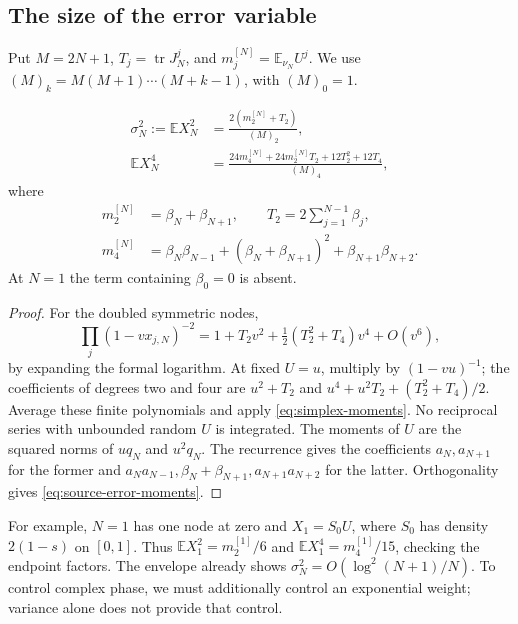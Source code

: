 \subsection{The size of the error variable}

Put \(M=2N+1\), \(T_j=\operatorname{tr}J_N^j\), and
\(m_j^{[N]}=\mathbb E_{\nu_N}U^j\). We use
\((M)_k=M(M+1)\cdots(M+k-1)\), with \((M)_0=1\).

\begin{proposition}
\label{prop:error-moments}
\begin{equation}
 \begin{aligned}
 \sigma_N^2:=\mathbb E X_N^2
   &=\frac{2(m_2^{[N]}+T_2)}{(M)_2},\\
 \mathbb E X_N^4
   &=\frac{24m_4^{[N]}+24m_2^{[N]}T_2+12T_2^2+12T_4}{(M)_4},
 \end{aligned}
 \label{eq:error-moments}
\end{equation}
where
\begin{equation}
 \begin{aligned}
 m_2^{[N]}&=\beta_N+\beta_{N+1},\qquad
 T_2=2\sum_{j=1}^{N-1}\beta_j,\\
 m_4^{[N]}&=\beta_N\beta_{N-1}+(\beta_N+\beta_{N+1})^2
                 +\beta_{N+1}\beta_{N+2}.
 \end{aligned}
 \label{eq:source-error-moments}
\end{equation}
At \(N=1\) the term containing \(\beta_0=0\) is absent.
\end{proposition}

\begin{proof}
For the doubled symmetric nodes,
\[
 \prod_j(1-vx_{j,N})^{-2}
   =1+T_2v^2+\tfrac12(T_2^2+T_4)v^4+O(v^6),
\]
by expanding the formal logarithm. At fixed \(U=u\), multiply
by \((1-vu)^{-1}\); the coefficients of degrees two and four
are \(u^2+T_2\) and
\(u^4+u^2T_2+(T_2^2+T_4)/2\). Average these finite polynomials
and apply \eqref{eq:simplex-moments}. No reciprocal series with
unbounded random \(U\) is integrated.
The moments of \(U\) are the squared norms of \(uq_N\) and
\(u^2q_N\). The recurrence gives the coefficients
\(a_N,a_{N+1}\) for the former and
\(a_Na_{N-1},\beta_N+\beta_{N+1},a_{N+1}a_{N+2}\) for the latter.
Orthogonality gives \eqref{eq:source-error-moments}.
\end{proof}

For example, \(N=1\) has one node at zero and
\(X_1=S_0U\), where \(S_0\) has density \(2(1-s)\) on
\([0,1]\). Thus \(\mathbb E X_1^2=m_2^{[1]}/6\) and
\(\mathbb E X_1^4=m_4^{[1]}/15\), checking the endpoint factors.
The envelope already shows
\(\sigma_N^2=O(\log^2(N+1)/N)\). To control complex phase,
we must additionally control an exponential weight; variance alone
does not provide that control.
